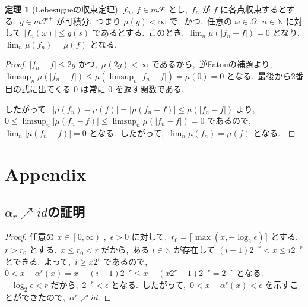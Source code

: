 \documentclass[a4j,11pt]{jarticle}
\theoremstyle{definition}
\newtheorem{theorem}{定理}
\begin{document}
\begin{theorem}[Lebesugueの収束定理]
  $f_n,\ f \in m\mathcal{F}$
  とし,\ 
  $f_n$
  が
  $f$
  に各点収束するとする.\ 
  $g \in m\mathcal{F}^+$
  が可積分,\ 
  つまり
  $\mu(g) < \infty$
  で,\ かつ,\ 任意の
  $\omega \in \Omega,\ n \in \mathbb{N}$
  に対して
  $|f_n(\omega)| \leq g(s)$
  であるとする.\ 
  このとき,\ 
  $\lim_n \mu\left( |f_n - f|\right) = 0$
  となり,\ 
  $\lim_n \mu(f_n) = \mu(f)$
  となる.\ 
\end{theorem}

\begin{proof}
  $|f_n-f| \leq 2g$
  かつ,\ 
  $\mu(2g) < \infty$
  であるから,\ 逆Fatouの補題より,\ 
  $\limsup_n \mu\left( |f_n-f|\right) \leq \mu\left( \limsup_n |f_n - f|\right) = \mu(0) = 0$
  となる.\ 
  最後から2番目の式に出てくる
  $0$
  は常に
  $0$
  を返す関数である.\ 

  したがって,\ 
  $|\mu(f_n) - \mu(f)| = |\mu(f_n - f)| \leq \mu(|f_n - f|)$
  より,\ 
  $0 \leq \limsup_n |\mu(f_n - f)| \leq \limsup_n \mu(|f_n-f|) = 0 $
  であるので,\ 
  $\lim_n |\mu(f_n - f)| = 0$
  となる.\ 
  したがって,\ 
  $\lim_n \mu(f_n) = \mu(f)$
  となる.\ 
\end{proof}

\section*{Appendix}
\subsection*{$\alpha_r \nearrow id$の証明}
\begin{proof}
  任意の
  $x\in \left[ 0, \infty \right)$
  ,\ 
  $\epsilon > 0$
  に対して,\ 
  $r_0 = \lceil \max(x, -\log_2 \epsilon) \rceil$
  とする.\ 
  $r > r_0$
  とする.\ 
  $x \leq r_0 < r$
  だから,\ ある
  $i \in \mathbb{N}$
  が存在して
  $(i-1)2^{-r} < x \leq i2^{-r}$
  とできる.\ 
  よって,\ 
  $i \geq x2^r$
  であるので,\ 
  $0 < x - \alpha^r(x) = x - (i-1)2^{-r} \leq x - (x2^r - 1)2^{-r} = 2^{-r}$
  となる.\ 
  $- \log_2 \epsilon < r$
  だから,\ 
  $2^{-r} < \epsilon$
  となる.\ 
  したがって,\ 
  $0 < x- \alpha^r(x) < \epsilon$
  を示すことができたので,\ 
  $\alpha^r \nearrow id$.
\end{proof}


%
%
\end{document}
